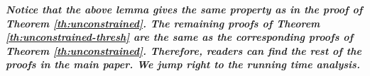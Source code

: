 \documentclass[10pt]{article} %
\theoremstyle{remark}
\newcommand{\OPT}{{\rm OPT}}
\begin{document}
\textbf{\textit{Notice that the above lemma gives the same property as in the proof of Theorem \ref{th:unconstrained}. The remaining proofs of Theorem \ref{th:unconstrained-thresh} are the same as the corresponding proofs of Theorem \ref{th:unconstrained}.
Therefore, readers can find the rest of the proofs in the main paper. We jump right to the running time analysis.}}

%     


%     
    
\end{document}
